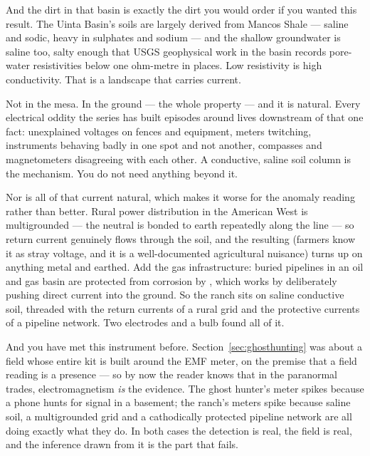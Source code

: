 
And the dirt in that basin is exactly the dirt you would order if you wanted this result. The
Uinta Basin's soils are largely derived from Mancos Shale --- saline and sodic, heavy in sulphates
and sodium --- and the shallow groundwater is saline too, salty enough that USGS geophysical work
in the basin records pore-water resistivities below one ohm-metre in places. Low resistivity is
high conductivity. That is a landscape that carries current.

 Not in the mesa. In the ground --- the whole property --- and it is natural.
Every electrical oddity the series has built episodes around lives downstream of that one fact:
unexplained voltages on fences and equipment, meters twitching, instruments behaving badly in one
spot and not another, compasses and magnetometers disagreeing with each other. A conductive,
saline soil column is the mechanism. You do not need anything beyond it.

Nor is all of that current natural, which makes it worse for the anomaly reading rather than
better. Rural power distribution in the American West is multigrounded --- the neutral is bonded to
earth repeatedly along the line --- so return current genuinely flows through the soil, and the
resulting  (farmers know it as stray voltage, and it is a
well-documented agricultural nuisance) turns up on anything metal and earthed. Add the gas
infrastructure: buried pipelines in an oil and gas basin are protected from corrosion by
, which works by deliberately pushing direct current into the ground.
So the ranch sits on saline conductive soil, threaded with the return currents of a rural grid and
the protective currents of a pipeline network. Two electrodes and a bulb found all of it.

And you have met this instrument before. Section~\ref{sec:ghosthunting} was about a field whose
entire kit is built around the EMF meter, on the premise that a field reading is a presence ---
so by now the reader knows that in the paranormal trades, electromagnetism \emph{is} the evidence.
The ghost hunter's meter spikes because a phone hunts for signal in a basement; the ranch's meters
spike because saline soil, a multigrounded grid and a cathodically protected pipeline network are
all doing exactly what they do. In both cases the detection is real, the field is real, and the
inference drawn from it is the part that fails.

